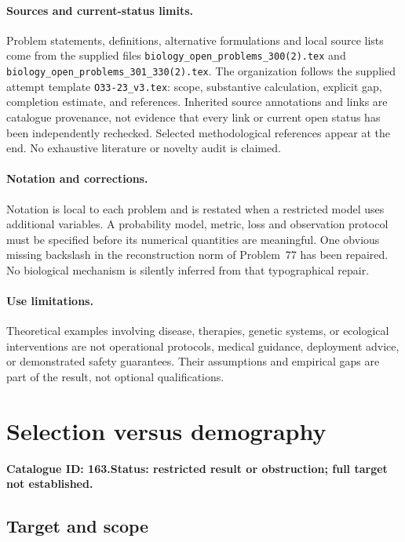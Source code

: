 \documentclass[11pt]{article}
\begin{document}
\paragraph{Sources and current-status limits.}
Problem statements, definitions, alternative formulations and local source lists
come from the supplied files
\texttt{biology\_open\_problems\_300(2).tex} and
\texttt{biology\_open\_problems\_301\_330(2).tex}.
The organization follows the supplied attempt template
\texttt{O33-23\_v3.tex}: scope, substantive calculation, explicit gap,
completion estimate, and references. Inherited source annotations and links are
catalogue provenance, not evidence that every link or current open status has
been independently rechecked. Selected methodological references appear at the
end. No exhaustive literature or novelty audit is claimed.

\paragraph{Notation and corrections.}
Notation is local to each problem and is restated when a restricted model uses
additional variables. A probability model, metric, loss and observation protocol
must be specified before its numerical quantities are meaningful. One obvious
missing backslash in the reconstruction norm of Problem~77 has been repaired.
No biological mechanism is silently inferred from that typographical repair.

\paragraph{Use limitations.}
Theoretical examples involving disease, therapies, genetic systems, or ecological
interventions are not operational protocols, medical guidance, deployment advice,
or demonstrated safety guarantees. Their assumptions and empirical gaps are part
of the result, not optional qualifications.

\setcounter{section}{162}
\section{Selection versus demography}
\label{prob:163}
\noindent\textbf{Catalogue ID: 163.}\quad \textbf{Status: restricted result or obstruction; full target not established.}
\subsection{Target and scope}
\end{document}
